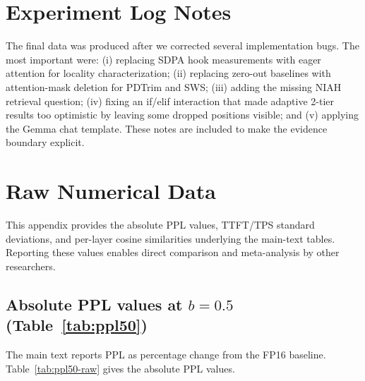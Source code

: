 \documentclass[11pt]{article}
\newcommand{\niah}{NIAH}
\newcommand{\budget}{b}
\theoremstyle{plain}
\theoremstyle{definition}
\begin{document}
\section{Experiment Log Notes}
\label{app:notes}

The final data was produced after we corrected several implementation bugs.  The most important were: (i) replacing SDPA hook measurements with eager attention for locality characterization; (ii) replacing zero-out baselines with attention-mask deletion for PDTrim and SWS; (iii) adding the missing \niah{} retrieval question; (iv) fixing an if/elif interaction that made adaptive 2-tier results too optimistic by leaving some dropped positions visible; and (v) applying the Gemma chat template.  These notes are included to make the evidence boundary explicit.

\section{Raw Numerical Data}
\label{app:raw}

This appendix provides the absolute PPL values, TTFT/TPS standard deviations, and per-layer cosine similarities underlying the main-text tables.  Reporting these values enables direct comparison and meta-analysis by other researchers.

\subsection{Absolute PPL values at $\budget=0.5$ (Table~\ref{tab:ppl50})}

The main text reports PPL as percentage change from the FP16 baseline.  Table~\ref{tab:ppl50-raw} gives the absolute PPL values.
\end{document}
